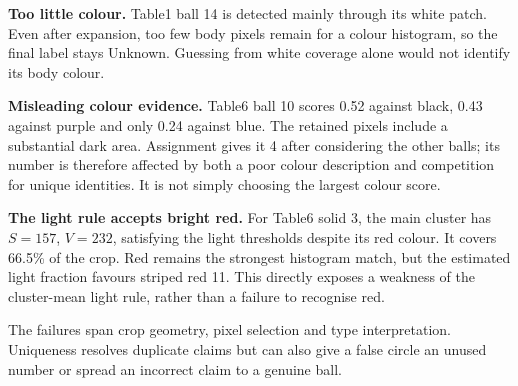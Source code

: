 \documentclass[12pt,a4paper]{article}
\begin{document}

\textbf{Too little colour.} Table1 ball 14 is detected mainly through its white
patch. Even after expansion, too few body pixels remain for a colour histogram,
so the final label stays Unknown. Guessing from white coverage alone would not
identify its body colour.

\textbf{Misleading colour evidence.} Table6 ball 10 scores 0.52 against black,
0.43 against purple and only 0.24 against blue. The retained pixels include a
substantial dark area. Assignment gives it 4 after considering the other balls;
its number is therefore affected by both a poor colour description and competition
for unique identities. It is not simply choosing the largest colour score.

\textbf{The light rule accepts bright red.} For Table6 solid 3, the main cluster
has $S=157$, $V=232$, satisfying the light thresholds despite its red colour.
It covers 66.5\% of the crop. Red remains the strongest histogram match, but the
estimated light fraction favours striped red 11. This directly exposes a weakness
of the cluster-mean light rule, rather than a failure to recognise red.

The failures span crop geometry, pixel selection and type interpretation.
Uniqueness resolves duplicate claims but can also give a false circle an unused
number or spread an incorrect claim to a genuine ball.
\newpage

\end{document}
